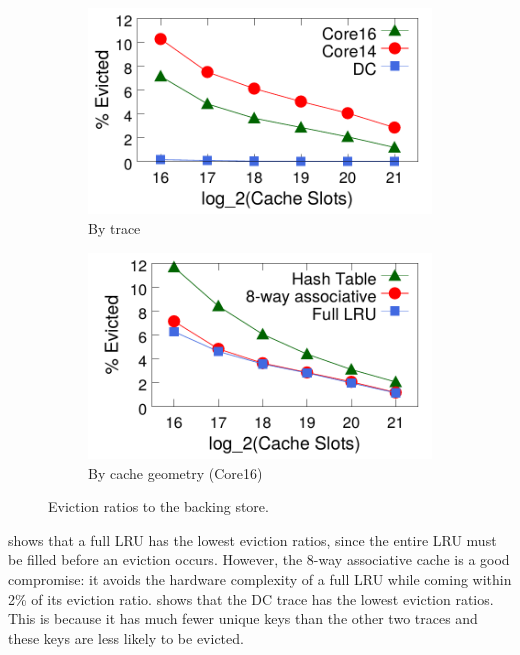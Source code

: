 \begin{figure}[!t]
\centering
\begin{subfigure}[t]{0.48\columnwidth}
\raggedright
\includegraphics[width=\linewidth]{pq_eviction-rate-alltraces.pdf}
\vspace{-0.2in}
\caption{By trace}
\label{fig:eviction-traces}
\end{subfigure}
\begin{subfigure}[t]{0.48\columnwidth}
\raggedleft
\includegraphics[width=\linewidth]{pq_eviction-rate-geo-core16.pdf}
\vspace{-0.2in}
\caption{By cache geometry (Core16)}
\label{fig:eviction-geo}
\end{subfigure}
\vspace{-0.1in}
\caption{Eviction ratios to the backing store.}
\vspace{-0.25in}
\label{fig:eviction-ratios}
\end{figure}

 shows that a full LRU has the lowest eviction ratios, since
the entire LRU must be filled before an eviction occurs. However, the 8-way
associative cache is a good compromise: it avoids the hardware complexity of a
full LRU while coming within 2\% of its eviction ratio.  
shows that the DC trace has the lowest eviction ratios.  This is because it has
much fewer unique keys than the other two traces and these keys are less likely
to be evicted.

